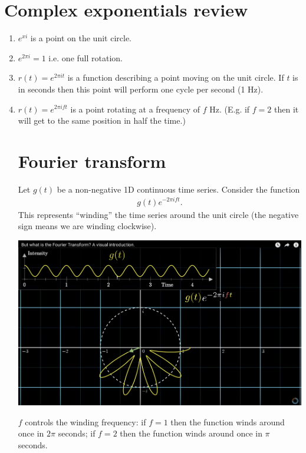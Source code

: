 \section{Complex exponentials review}
\begin{enumerate}
\item $e^{xi}$ is a point on the unit circle.
\item $e^{2\pi i} = 1$ i.e. one full rotation.
\item $r(t) = e^{2\pi i t}$ is a function describing a point moving on the unit circle. If $t$ is in seconds then
  this point will perform one cycle per second (1 Hz).
\item $r(t) = e^{2\pi i f t}$ is a point rotating at a frequency of $f$ Hz. (E.g. if $f = 2$ then it will get to
  the same position in half the time.)



\section{Fourier transform}

Let $g(t)$ be a non-negative 1D continuous time series. Consider the function
\begin{align*}
  g(t)e^{-2\pi i f t}.
\end{align*}
This represents ``winding'' the time series around the unit circle (the negative sign means we are winding
clockwise).

\begin{mdframed}
\includegraphics[width=400pt]{img/fourier--complex-exponentials-review--fourier-transform-75f4.png}
\end{mdframed}

$f$ controls the winding frequency: if $f = 1$ then the function winds around once in $2\pi$ seconds;
if $f = 2$ then the function winds around once in $\pi$ seconds.


\end{enumerate}
